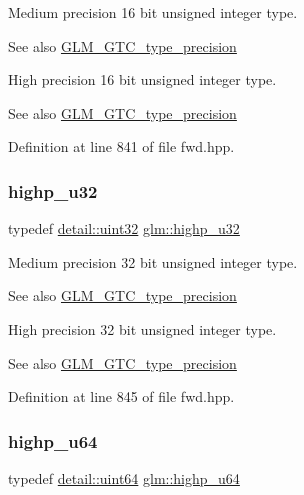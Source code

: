 Medium precision 16 bit unsigned integer type. \begin{DoxySeeAlso}{See also}
\mbox{\hyperlink{group__gtc__type__precision}{G\+L\+M\+\_\+\+G\+T\+C\+\_\+type\+\_\+precision}}
\end{DoxySeeAlso}
High precision 16 bit unsigned integer type. \begin{DoxySeeAlso}{See also}
\mbox{\hyperlink{group__gtc__type__precision}{G\+L\+M\+\_\+\+G\+T\+C\+\_\+type\+\_\+precision}} 
\end{DoxySeeAlso}


Definition at line 841 of file fwd.\+hpp.

\mbox{\label{group__gtc__type__precision_gae8e8a2c712653891a03c171795286ac5}} 
\subsubsection{\texorpdfstring{highp\_u32}{highp\_u32}}
{\footnotesize\ttfamily typedef \mbox{\hyperlink{namespaceglm_1_1detail_ade6cfbf377022aaa391af8cd50489222}{detail\+::uint32}} \mbox{\hyperlink{group__gtc__type__precision_gae8e8a2c712653891a03c171795286ac5}{glm\+::highp\+\_\+u32}}}

Medium precision 32 bit unsigned integer type. \begin{DoxySeeAlso}{See also}
\mbox{\hyperlink{group__gtc__type__precision}{G\+L\+M\+\_\+\+G\+T\+C\+\_\+type\+\_\+precision}}
\end{DoxySeeAlso}
High precision 32 bit unsigned integer type. \begin{DoxySeeAlso}{See also}
\mbox{\hyperlink{group__gtc__type__precision}{G\+L\+M\+\_\+\+G\+T\+C\+\_\+type\+\_\+precision}} 
\end{DoxySeeAlso}


Definition at line 845 of file fwd.\+hpp.

\mbox{\label{group__gtc__type__precision_ga6006ea883d3c0491791650b2fb84de39}} 
\subsubsection{\texorpdfstring{highp\_u64}{highp\_u64}}
{\footnotesize\ttfamily typedef \mbox{\hyperlink{namespaceglm_1_1detail_adec4b19bf4982125e122db2fe03c5810}{detail\+::uint64}} \mbox{\hyperlink{group__gtc__type__precision_ga6006ea883d3c0491791650b2fb84de39}{glm\+::highp\+\_\+u64}}}

